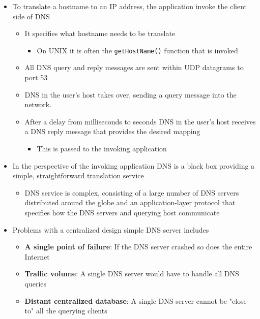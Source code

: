 \documentclass[11pt]{article}
\providecommand{\tightlist}{%
      \setlength{\itemsep}{0pt}\setlength{\parskip}{0pt}}
\begin{document}
\begin{itemize}
\tightlist
\item
  To translate a hostname to an IP address, the application invoke the
  client side of DNS

  \begin{itemize}
  \tightlist
  \item
    It specifies what hostname needs to be translate

    \begin{itemize}
    \tightlist
    \item
      On UNIX it is often the \texttt{getHostName()} function that is
      invoked
    \end{itemize}
  \item
    All DNS query and reply messages are sent within UDP datagrams to
    port 53
  \item
    DNS in the user's host takes over, sending a query message into the
    network.
  \item
    After a delay from milliseconds to seconds DNS in the user's host
    receives a DNS reply message that provides the desired mapping

    \begin{itemize}
    \tightlist
    \item
      This is passed to the invoking application
    \end{itemize}
  \end{itemize}
\item
  In the perspective of the invoking application DNS is a black box
  providing a simple, straightforward translation service

  \begin{itemize}
  \tightlist
  \item
    DNS service is complex, consisting of a large number of DNS servers
    distributed around the globe and an application-layer protocol that
    specifies how the DNS servers and querying host communicate
  \end{itemize}
\item
  Problems with a centralized design simple DNS server includes

  \begin{itemize}
  \tightlist
  \item
    \textbf{A single point of failure}: If the DNS server crashed so
    does the entire Internet
  \item
    \textbf{Traffic volume}: A single DNS server would have to handle
    all DNS queries
  \item
    \textbf{Distant centralized database}: A single DNS server cannot be
    "close to" all the querying clients


\end{itemize}
\end{itemize}
\end{document}
